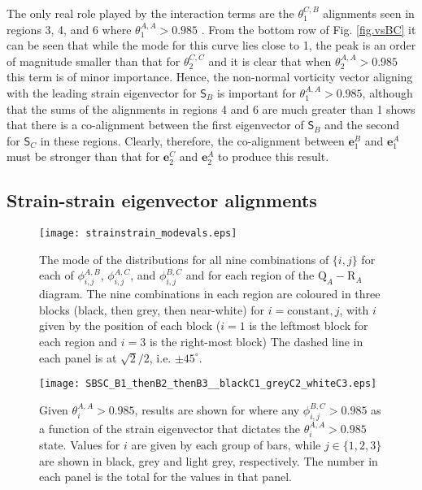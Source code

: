 \documentclass[preprint,amssymb,amsmath,aip,cha]{revtex4-1}
\begin{document}
The only real role played by the interaction terms are the $\theta^{C,B}_{1}$ alignments seen in regions 3, 4, and 6 where $\theta^{A,A}_{1} > 0.985$ . From the bottom row of Fig. \ref{fig.vsBC} it can be seen that while the mode for this curve lies close to 1, the peak is an order of magnitude smaller than that for $\theta^{C,C}_{2}$ and it is clear that when $\theta^{A,A}_{2} > 0.985$ this term is of minor importance. Hence, the non-normal vorticity vector aligning with the leading strain eigenvector for $\mathsf{S}_{B}$ is important for $\theta^{A,A}_{1} > 0.985$, although that the sums of the alignments in regions 4 and 6 are much greater than 1 shows that there is a co-alignment between the first eigenvector of $\mathsf{S}_{B}$ and the second for $\mathsf{S}_{C}$ in these regions. Clearly, therefore, the co-alignment between $\mathbf{e}^{B}_{1}$ and $\mathbf{e}^{A}_{1}$ must be stronger than that for $\mathbf{e}^{C}_{2}$ and $\mathbf{e}^{A}_{2}$ to produce this result. 

\subsection{Strain-strain eigenvector alignments}

\begin{figure*}
  \texttt{[image: strainstrain\_modevals.eps]}
\caption{The mode of the distributions for all nine combinations of $\{i,j\}$ for each of $\phi_{i,j}^{A,B}$, $\phi_{i,j}^{A,C}$, and $\phi_{i,j}^{B,C}$ and for each region of the   $\mbox{Q}_{A}-\mbox{R}_{A}$ diagram. The nine combinations in each region are coloured in three blocks (black, then grey, then near-white) for $i = \mbox{constant}, j$, with $i$ given by the position of each block ($i = 1$ is the leftmost block for each region and $i = 3$ is the right-most block) The dashed line in each panel is at $\sqrt{2} / 2$, i.e. $\pm 45^{\circ}$. 
}
\label{fig.ssmode}   
\end{figure*}

\begin{figure*}
  \texttt{[image: SBSC\_B1\_thenB2\_thenB3\_\_blackC1\_greyC2\_whiteC3.eps]}
\caption{Given $\theta^{A,A}_{i} > 0.985$, results are shown for where any $\phi^{B,C}_{i,j} > 0.985$ as a function of the strain eigenvector that dictates the $\theta^{A,A}_{i} > 0.985$ state. Values for $i$ are given by each group of bars, while $j \in \{1, 2, 3\}$ are shown in black, grey and light grey, respectively. The number in each panel is the total for the values in that panel.
}
\label{fig.SBC_vvASA}   
\end{figure*}
\end{document}
